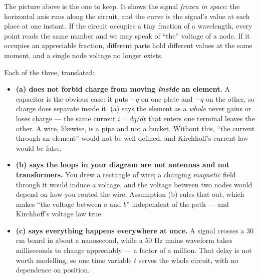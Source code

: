 \documentclass[11pt,a4paper]{article}
\begin{document}
The picture above is the one to keep. It shows the signal \emph{frozen in space}: the
horizontal axis runs along the circuit, and the curve is the signal's value at each place
at one instant. If the circuit occupies a tiny fraction of a wavelength, every point reads
the same number and we may speak of ``the'' voltage of a node. If it occupies an
appreciable fraction, different parts hold different values at the same moment, and a
single node voltage no longer exists.

Each of the three, translated:

\begin{itemize}
  \item \textbf{(a) does not forbid charge from moving \emph{inside} an element.} A
        capacitor is the obvious case: it puts $+q$ on one plate and $-q$ on the other, so
        charge does separate inside it. (a) says the element as a \emph{whole} never gains
        or loses charge --- the same current $i = dq/dt$ that enters one terminal leaves
        the other. A wire, likewise, is a pipe and not a bucket. Without this, ``the
        current through an element'' would not be well defined, and Kirchhoff's current
        law would be false.
  \item \textbf{(b) says the loops in your diagram are not antennas and not
        transformers.} You drew a rectangle of wire; a changing \emph{magnetic} field
        through it would induce a voltage, and the voltage between two nodes would depend
        on how you routed the wire. Assumption (b) rules that out, which makes ``the
        voltage between $a$ and $b$'' independent of the path --- and Kirchhoff's voltage
        law true.
  \item \textbf{(c) says everything happens everywhere at once.} A signal crosses a
        $30$ cm board in about a nanosecond, while a $50$ Hz mains waveform takes
        milliseconds to change appreciably --- a factor of a million. That delay is not
        worth modelling, so one time variable $t$ serves the whole circuit, with no
        dependence on position.
\end{itemize}

\begin{center}
\end{center}
\end{document}
